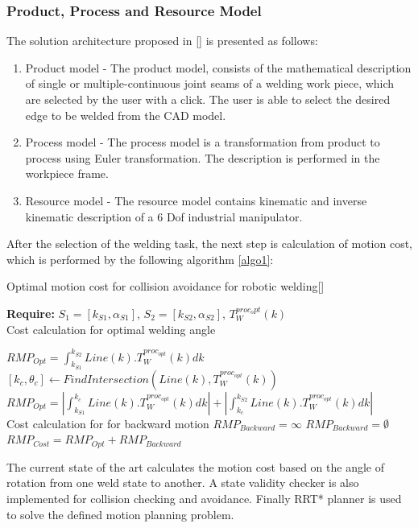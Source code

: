 \subsubsection{Product, Process and Resource Model}
The solution architecture proposed in [\citet{DiazP2016}] is presented as follows:
\begin{enumerate}
\item Product model - The product model, consists of the mathematical description of single or multiple-continuous joint seams of a welding work piece, which are selected by the user with a click. The user is able to select the desired edge to be welded from the CAD model.
\item Process model - The process model is a transformation from product
to process using Euler transformation. The description is performed in the workpiece
frame.
\item Resource model - The resource model contains kinematic and inverse kinematic
description of a 6 Dof industrial manipulator.
\end{enumerate}
After the selection of the welding task, the next step is calculation of motion cost, which is performed by the following algorithm \ref{algo1}:

\begin{algorithm}
		\caption{Optimal motion cost for collision avoidance for robotic welding[\citet{DiazP2016}]}
		\label{algo1}
        \textbf{Require:} $S_{1}=[k_{S1},\alpha_{S1}]$, $S_{2}=[k_{S2},\alpha_{S2}]$, 			$T_{W}^{proc_opt}(k)$ \\
        {Cost calculation for optimal welding angle}
		\begin{algorithmic}[1]
            	\State $RMP_{Opt} = \int_{k_{S1}}^{k_{S2}}Line(k).T_{W}^{proc_{opt}}(k)dk$
			\Else
            \State $[k_{c},\theta_{c}] \gets FindIntersection(Line(k),T_{W}^{proc_{opt}}(k))$
            \State $RMP_{Opt} = |\int_{k_{S1}}^{k_{c}}Line(k).T_{W}^{proc_{opt}}(k)dk| + |\int_{k_{c}}^{k_{S2}}Line(k).T_{W}^{proc_{opt}}(k)dk|$
            \EndIf \\
            {Cost calculation for for backward motion}
			\State $RMP_{Backward} = \infty$
            \Else
            \State $RMP_{Backward} = \emptyset$
            \EndIf
			\State $RMP_{Cost} = RMP_{Opt} + RMP_{Backward}$
		\end{algorithmic}
	\end{algorithm}
The current state of the art calculates the motion cost based on the angle of rotation from one weld state to another. A state validity checker is also implemented for collision checking and avoidance. Finally RRT* planner is used to solve the defined motion planning problem.
